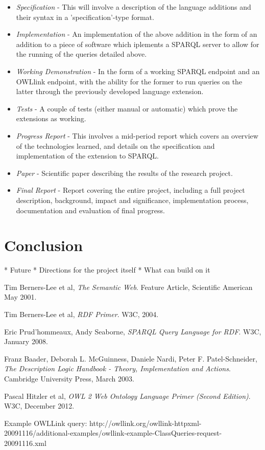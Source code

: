 \documentclass{article}
\begin{document}
\begin{itemize}
  \item \emph{Specification} - This will involve a description of the language additions 
  and their syntax in a 'specification'-type format. 
  \item \emph{Implementation} - An implementation of the above addition in the
  form of an addition to a piece of software which iplements a SPARQL server to
  allow for the running of the queries detailed above.
  \item \emph{Working Demonstration} - In the form of a working SPARQL endpoint
  and an OWLlink endpoint, with the ability for the former to run queries on the
  latter through the previously developed language extension.
  \item \emph{Tests} - A couple of tests (either manual or automatic) which
  prove the extensions as working.
  \item \emph{Progress Report} - This involves a mid-period report which covers
  an overview of the technologies learned, and details on the specification and 
  implementation of the extension to SPARQL.
  \item \emph{Paper} - Scientific paper describing the results of the research
  project.
  \item \emph{Final Report} - Report covering the entire project, including
  a full project description, background, impact and significance, 
  implementation process, documentation and evaluation of final progress.
\end{itemize}

\section{Conclusion}

* Future
* Directions for the project itself
* What can build on it

\begin{thebibliography}{9}

  Tim Berners-Lee et al,
  \emph{The Semantic Web}.
  Feature Article, Scientific American
  May 2001.

 Tim Berners-Lee et al,
 \emph{RDF Primer}.
 W3C,
 2004.

  Eric Prud'hommeaux, Andy Seaborne,
  \emph{SPARQL Query Language for RDF}.
  W3C,
  January 2008.

 Franz Baader, Deborah L. McGuinness, Daniele Nardi, Peter F. Patel-Schneider,
 \emph{The Description Logic Handbook - Theory, Implementation and Actions}.
 Cambridge University Press,
 March 2003.

  Pascal Hitzler et al,
  \emph{OWL 2 Web Ontology Language Primer (Second Edition)}.
  W3C,
  December 2012.

Example OWLLink query:
http://owllink.org/owllink-httpxml-20091116/additional-examples/owllink-example-ClassQueries-request-20091116.xml

\end{thebibliography}
\end{document}
